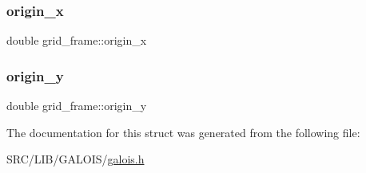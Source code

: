 \subsubsection{\texorpdfstring{origin\+\_\+x}{origin\_x}}
{\footnotesize\ttfamily double grid\+\_\+frame\+::origin\+\_\+x}

\mbox{\label{structgrid__frame_a49a2bd792c58c6848fd86478758dfdad}} 
\subsubsection{\texorpdfstring{origin\+\_\+y}{origin\_y}}
{\footnotesize\ttfamily double grid\+\_\+frame\+::origin\+\_\+y}



The documentation for this struct was generated from the following file\+:\begin{DoxyCompactItemize}
\item 
S\+R\+C/\+L\+I\+B/\+G\+A\+L\+O\+I\+S/\mbox{\hyperlink{galois_8h}{galois.\+h}}\end{DoxyCompactItemize}
